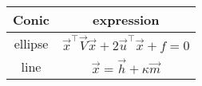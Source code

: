 \begin{tabular}[12pt]{ |c|c|}
    \hline
    \textbf{Conic} & \textbf{expression}\\ 
    \hline
    ellipse & $\vec{x}^\top\vec{V}\vec{x} + 2\vec{u}^\top\vec{x} + f = 0$\\
    \hline
    line & $\vec{x}=\vec{h}+\kappa\vec{m}$\\
    \hline
\end{tabular}
